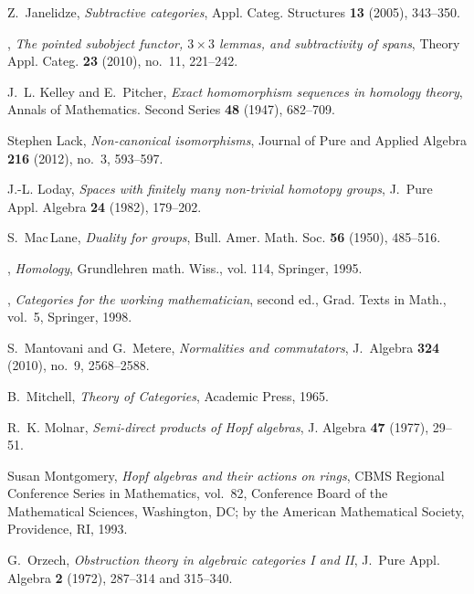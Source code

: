 \documentclass [12pt,oneside]{book}%
\theoremstyle{captionstyle}  %
\begin{document}
\begin{thebibliography}{10}
    Z.~Janelidze, \emph{Subtractive categories}, Appl. Categ. Structures
    \textbf{13} (2005), 343--350.

    \bysame, \emph{The pointed subobject functor, {$3\times 3$} lemmas, and
        subtractivity of spans}, Theory Appl. Categ. \textbf{23} (2010), no.~11,
    221--242.

    J.~L. Kelley and E.~Pitcher, \emph{Exact homomorphism sequences in homology
        theory}, Annals of Mathematics. Second Series \textbf{48} (1947), 682--709.

    Stephen Lack, \emph{Non-canonical isomorphisms}, Journal of Pure and Applied
    Algebra \textbf{216} (2012), no.~3, 593--597.

    J.-L. Loday, \emph{Spaces with finitely many non-trivial homotopy groups},
    J.~Pure Appl. Algebra \textbf{24} (1982), 179--202.

    S.~{Mac\,Lane}, \emph{Duality for groups}, Bull. Amer. Math. Soc. \textbf{56}
    (1950), 485--516.

    \bysame, \emph{Homology}, Grundlehren math. Wiss., vol. 114, Springer, 1995.

    \bysame, \emph{Categories for the working mathematician}, second ed., Grad.
    Texts in Math., vol.~5, Springer, 1998.

    S.~Mantovani and G.~Metere, \emph{Normalities and commutators}, J.~Algebra
    \textbf{324} (2010), no.~9, 2568--2588.

    B.~Mitchell, \emph{{Theory of Categories}}, Academic Press, 1965.

    R.~K. Molnar, \emph{Semi-direct products of {H}opf algebras}, J. Algebra
    \textbf{47} (1977), 29--51.

    Susan Montgomery, \emph{Hopf algebras and their actions on rings}, CBMS
    Regional Conference Series in Mathematics, vol.~82, Conference Board of the
    Mathematical Sciences, Washington, DC; by the American Mathematical Society,
    Providence, RI, 1993.

    G.~Orzech, \emph{Obstruction theory in algebraic categories {I} and {II}},
    J.~Pure Appl. Algebra \textbf{2} (1972), 287--314 and 315--340.


\end{thebibliography}
\end{document}
